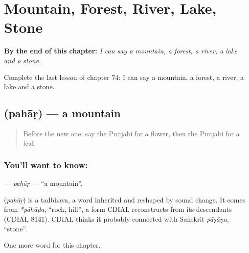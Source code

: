 
\chapter{Mountain, Forest, River, Lake, Stone}
\label{ch:pa-mountain-forest-river-lake-stone}

\begin{chapteropening}
\textbf{By the end of this chapter:} \emph{I can say a mountain, a forest, a river, a lake and a stone.}

Complete the last lesson of chapter 74: I can say a mountain, a forest, a river, a lake and a stone.
\end{chapteropening}

\section[\texorpdfstring{\pa{ਪਹਾੜ} (pahāṛ)}{ਪਹਾੜ (pahāṛ)}]{ (pahāṛ) — a mountain}

\label{lesson:PA-C74-pahar}



\begin{quote}
Before the new one: say the Punjabi for a flower, then the Punjabi for a leaf.
\end{quote}

\subsection*{You'll want to know: }
\textbf{} — \emph{pahāṛ} — \textquotedblleft{}a mountain\textquotedblright{}.

\begin{cousinweb}
\textbf{} (\emph{pahāṛ}) is a tadbhava, a word inherited and reshaped by sound change. It comes from \emph{*pāhāḍa}, \textquotedblleft{}rock, hill\textquotedblright{}, a form CDIAL reconstructs from its descendants (CDIAL 8141). CDIAL thinks it probably connected with Sanskrit \emph{pāṣāṇa}, \textquotedblleft{}stone\textquotedblright{}.
\end{cousinweb}

\begin{grammarlens}[title={What you've built}]
One more word for this chapter.
\end{grammarlens}

